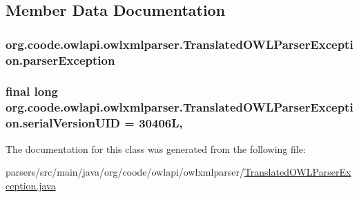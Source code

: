 \subsection{Member Data Documentation}
\hypertarget{classorg_1_1coode_1_1owlapi_1_1owlxmlparser_1_1_translated_o_w_l_parser_exception_ab06b1605f3c1bb0a6393dd7d54d1676f}{
\subsubsection[{parser\-Exception}]{ org.\-coode.\-owlapi.\-owlxmlparser.\-Translated\-O\-W\-L\-Parser\-Exception.\-parser\-Exception\hspace{0.3cm}{\ttfamily [private]}}}\label{classorg_1_1coode_1_1owlapi_1_1owlxmlparser_1_1_translated_o_w_l_parser_exception_ab06b1605f3c1bb0a6393dd7d54d1676f}
\hypertarget{classorg_1_1coode_1_1owlapi_1_1owlxmlparser_1_1_translated_o_w_l_parser_exception_a6c0f5fc85c2d9bee867c70bac6ccba50}{
\subsubsection[{serial\-Version\-U\-I\-D}]{\setlength{\rightskip}{0pt plus 5cm}final long org.\-coode.\-owlapi.\-owlxmlparser.\-Translated\-O\-W\-L\-Parser\-Exception.\-serial\-Version\-U\-I\-D = 30406\-L\hspace{0.3cm}{\ttfamily [static]}, {\ttfamily [private]}}}\label{classorg_1_1coode_1_1owlapi_1_1owlxmlparser_1_1_translated_o_w_l_parser_exception_a6c0f5fc85c2d9bee867c70bac6ccba50}


The documentation for this class was generated from the following file\-:\begin{DoxyCompactItemize}
\item 
parsers/src/main/java/org/coode/owlapi/owlxmlparser/\hyperlink{_translated_o_w_l_parser_exception_8java}{Translated\-O\-W\-L\-Parser\-Exception.\-java}\end{DoxyCompactItemize}
